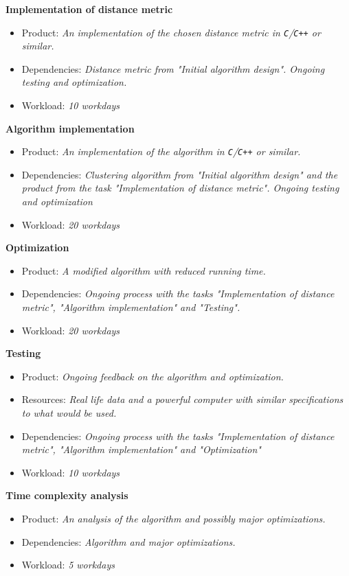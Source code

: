 \documentclass[11pt,a4paper]{article}
\begin{document}
\noindent
\textbf{Implementation of distance metric}
\begin{itemize}
  \item Product: \textit{An implementation of the chosen distance metric in
    \texttt{C}/\texttt{C++} or similar.}
  \item Dependencies: \textit{Distance metric from "Initial algorithm design".
    Ongoing testing and optimization.}
  \item Workload: \textit{10 workdays}
\end{itemize}

\noindent
\textbf{Algorithm implementation}
\begin{itemize}
  \item Product: \textit{An implementation of the algorithm in
    \texttt{C}/\texttt{C++} or similar.}
  \item Dependencies: \textit{Clustering algorithm from "Initial algorithm
    design" and the product from the task "Implementation of distance metric".
    Ongoing testing and optimization}
  \item Workload: \textit{20 workdays}
\end{itemize}

\noindent
\textbf{Optimization}
\begin{itemize}
  \item Product: \textit{A modified algorithm with reduced running time.}
  \item Dependencies: \textit{Ongoing process with the tasks "Implementation of
    distance metric", "Algorithm implementation" and "Testing".}
  \item Workload: \textit{20 workdays}
\end{itemize}

\noindent
\textbf{Testing}
\begin{itemize}
  \item Product: \textit{Ongoing feedback on the algorithm and optimization.}
  \item Resources: \textit{Real life data and a powerful computer with similar
    specifications to what would be used.}
  \item Dependencies: \textit{Ongoing process with the tasks "Implementation of
    distance metric", "Algorithm implementation" and "Optimization"}
  \item Workload: \textit{10 workdays}
\end{itemize}

\noindent
\textbf{Time complexity analysis}
\begin{itemize}
  \item Product: \textit{An analysis of the algorithm and possibly major
    optimizations.}
  \item Dependencies: \textit{Algorithm and major optimizations.}
  \item Workload: \textit{5 workdays}
\end{itemize}
\end{document}
